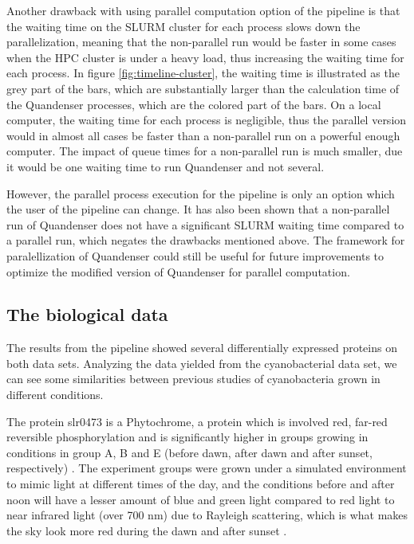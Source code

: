 Another drawback with using parallel computation option of the pipeline is that the waiting time on the SLURM cluster for each process slows down the parallelization, meaning that the non-parallel run would be faster in some cases when the HPC cluster is under a heavy load, thus increasing the waiting time for each process. In figure \ref{fig:timeline-cluster}, the waiting time is illustrated as the grey part of the bars, which are substantially larger than the calculation time of the Quandenser processes, which are the colored part of the bars. On a local computer, the waiting time for each process is negligible, thus the parallel version would in almost all cases be faster than a non-parallel run on a powerful enough computer. The impact of queue times for a non-parallel run is much smaller, due it would be one waiting time to run Quandenser and not several.

However, the parallel process execution for the pipeline is only an option which the user of the pipeline can change. It has also been shown that a non-parallel run of Quandenser does not have a significant SLURM waiting time compared to a parallel run, which negates the drawbacks mentioned above. The framework for paralellization of Quandenser could still be useful for future improvements to optimize the modified version of Quandenser for parallel computation.

\subsection{The biological data}
The results from the pipeline showed several differentially expressed proteins on both data sets. Analyzing the data yielded from the cyanobacterial data set, we can see some similarities between previous studies of cyanobacteria grown in different conditions.


The protein slr0473 is a Phytochrome, a protein which is involved red, far-red reversible phosphorylation and is significantly higher in groups growing in conditions in group A, B and E (before dawn, after dawn and after sunset, respectively) \cite{phytochrome}. The experiment groups were grown under a simulated environment to mimic light at different times of the day, and the conditions before and after noon will have a lesser amount of blue and green light compared to red light to near infrared light (over 700 nm) due to Rayleigh scattering, which is what makes the sky look more red during the dawn and after sunset \cite{rayleigh}.

